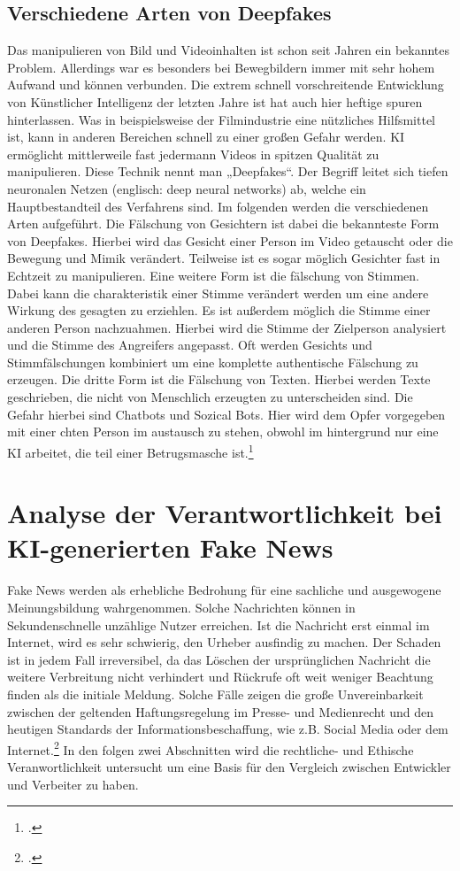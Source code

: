 \documentclass[Thesis.tex]{subfiles}
\begin{document}
\subsection{Verschiedene Arten von Deepfakes}
Das manipulieren von Bild und Videoinhalten ist schon seit Jahren ein bekanntes Problem. Allerdings war es besonders bei Bewegbildern 
immer mit sehr hohem Aufwand und können verbunden. Die extrem schnell vorschreitende Entwicklung von Künstlicher Intelligenz der letzten
Jahre ist hat auch hier heftige spuren hinterlassen. Was in beispielsweise der Filmindustrie eine nützliches Hilfsmittel ist,
kann in anderen Bereichen schnell zu einer großen Gefahr werden. \ac{KI} ermöglicht mittlerweile fast jedermann Videos in spitzen Qualität 
zu manipulieren. Diese Technik nennt man „Deepfakes“. Der Begriff leitet sich tiefen neuronalen Netzen (englisch: deep neural networks) ab, welche ein Hauptbestandteil des Verfahrens sind.
Im folgenden werden die verschiedenen Arten aufgeführt.
Die Fälschung von Gesichtern ist dabei die bekannteste Form von Deepfakes. Hierbei wird das Gesicht einer Person im Video getauscht oder die Bewegung und Mimik verändert.
Teilweise ist es sogar möglich Gesichter fast in Echtzeit zu manipulieren.
Eine weitere Form ist die fälschung von Stimmen. Dabei kann die charakteristik einer Stimme verändert werden um eine andere Wirkung des gesagten zu erziehlen.
Es ist außerdem möglich die Stimme einer anderen Person nachzuahmen. Hierbei wird die Stimme der Zielperson analysiert und die Stimme des Angreifers angepasst.
Oft werden Gesichts und Stimmfälschungen kombiniert um eine komplette authentische Fälschung zu erzeugen.
Die dritte Form ist die Fälschung von Texten. Hierbei werden Texte geschrieben, die nicht von Menschlich erzeugten zu unterscheiden sind.
Die Gefahr hierbei sind Chatbots und Sozical Bots. Hier wird dem Opfer vorgegeben mit einer chten Person im austausch zu stehen,
obwohl im hintergrund nur eine \ac{KI} arbeitet, die teil einer Betrugsmasche ist.\footcite{DeepfakesGefahren}

\clearpage
\section{Analyse der Verantwortlichkeit bei KI-generierten Fake News}
Fake News werden als erhebliche Bedrohung für eine sachliche und ausgewogene Meinungsbildung wahrgenommen.
Solche Nachrichten können in Sekundenschnelle unzählige Nutzer erreichen.
Ist die Nachricht erst einmal im Internet, wird es sehr schwierig, den Urheber ausfindig zu machen.
Der Schaden ist in jedem Fall irreversibel, da das Löschen der ursprünglichen Nachricht die weitere Verbreitung
  nicht verhindert und Rückrufe oft weit weniger Beachtung finden als die initiale Meldung.
  Solche Fälle zeigen die große Unvereinbarkeit zwischen der geltenden Haftungsregelung im Presse- 
  und Medienrecht und den heutigen Standards der Informationsbeschaffung, wie z.B. Social Media oder 
  dem Internet.\footcite{DBWDUmgangmitFakenews} 
In den folgen zwei Abschnitten wird die rechtliche- und Ethische Veranwortlichkeit untersucht um eine
Basis für den Vergleich zwischen Entwickler und Verbeiter zu haben.
\end{document}
